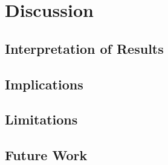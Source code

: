 \section{Discussion}
\label{sec:discussion}


\subsection{Interpretation of Results}

\subsection{Implications}

\subsection{Limitations}

\subsection{Future Work}
